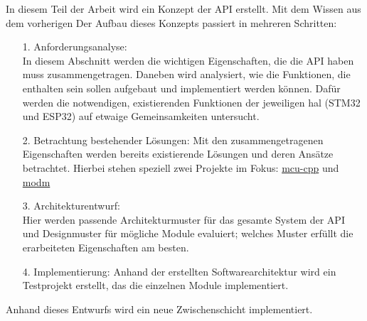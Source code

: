 In diesem Teil der Arbeit wird ein Konzept der API erstellt.
Mit dem Wissen aus dem vorherigen
Der Aufbau dieses Konzepts passiert in mehreren Schritten:
\begin{itemize}
	\item [1.] Anforderungsanalyse: \\In diesem Abschnitt werden die wichtigen Eigenschaften, die die API haben muss zusammengetragen. Daneben wird analysiert, wie die Funktionen, die enthalten sein sollen aufgebaut und implementiert werden können. Dafür werden die notwendigen, existierenden Funktionen der jeweiligen \gls{hal} (STM32 und ESP32) auf etwaige Gemeinsamkeiten untersucht.
	\item [2.] Betrachtung bestehender Lösungen: Mit den zusammengetragenen Eigenschaften werden bereits existierende Lösungen und deren Ansätze betrachtet. Hierbei stehen speziell zwei Projekte im Fokus: \href{https://github.com/yh-sb/mcu-cpp.git}{mcu-cpp} und \href{https://github.com/modm-io/modm.git}{modm} %
	\item [3.] Architekturentwurf: \\Hier werden passende Architekturmuster für das gesamte System der API und Designmuster für mögliche Module evaluiert; welches Muster erfüllt die erarbeiteten Eigenschaften am besten.
	\item [4.] Implementierung: Anhand der erstellten Softwarearchitektur wird ein Testprojekt erstellt, das die einzelnen Module implementiert. 
\end{itemize}

Anhand dieses Entwurfs wird ein neue Zwischenschicht implementiert.
